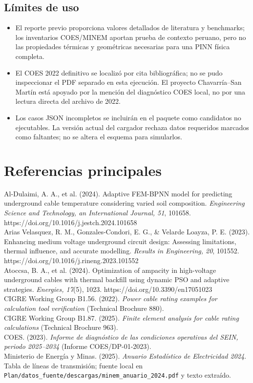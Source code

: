 \documentclass[11pt,a4paper,oneside]{report}
\begin{document}
\section*{L\'imites de uso}
\begin{itemize}
  \item El reporte previo proporciona valores detallados de literatura y benchmarks; los inventarios COES/MINEM aportan prueba de contexto peruano, pero no las propiedades t\'ermicas y geom\'etricas necesarias para una PINN f\'isica completa.
  \item El COES 2022 definitivo se localiz\'o por cita bibliogr\'afica; no se pudo inspeccionar el PDF separado en esta ejecuci\'on. El proyecto Chavarr\'ia--San Mart\'in est\'a apoyado por la menci\'on del diagn\'ostico COES local, no por una lectura directa del archivo de 2022.
  \item Los casos JSON incompletos se incluir\'an en el paquete como candidatos no ejecutables. La versi\'on actual del cargador rechaza datos requeridos marcados como faltantes; no se altera el esquema para simularlos.
\end{itemize}

\chapter*{Referencias principales}
Al-Dulaimi, A. A., et al. (2024). Adaptive FEM-BPNN model for predicting underground cable temperature considering varied soil composition. \textit{Engineering Science and Technology, an International Journal, 51}, 101658. https://doi.org/10.1016/j.jestch.2024.101658\\
Arias Velasquez, R. M., Gonzales-Condori, E. G., \& Velarde Loayza, P. E. (2023). Enhancing medium voltage underground circuit design: Assessing limitations, thermal influence, and accurate modelling. \textit{Results in Engineering, 20}, 101552. https://doi.org/10.1016/j.rineng.2023.101552\\
Atoccsa, B. A., et al. (2024). Optimization of ampacity in high-voltage underground cables with thermal backfill using dynamic PSO and adaptive strategies. \textit{Energies, 17}(5), 1023. https://doi.org/10.3390/en17051023\\
CIGRE Working Group B1.56. (2022). \textit{Power cable rating examples for calculation tool verification} (Technical Brochure 880).\\
CIGRE Working Group B1.87. (2025). \textit{Finite element analysis for cable rating calculations} (Technical Brochure 963).\\
COES. (2023). \textit{Informe de diagn\'ostico de las condiciones operativas del SEIN, periodo 2025--2034} (Informe COES/DP-01-2023).\\
Ministerio de Energ\'ia y Minas. (2025). \textit{Anuario Estad\'istico de Electricidad 2024}. Tabla de l\'ineas de transmisi\'on; fuente local en \texttt{Plan/datos\_fuente/descargas/minem\_anuario\_2024.pdf} y texto extra\'ido.
\end{document}
